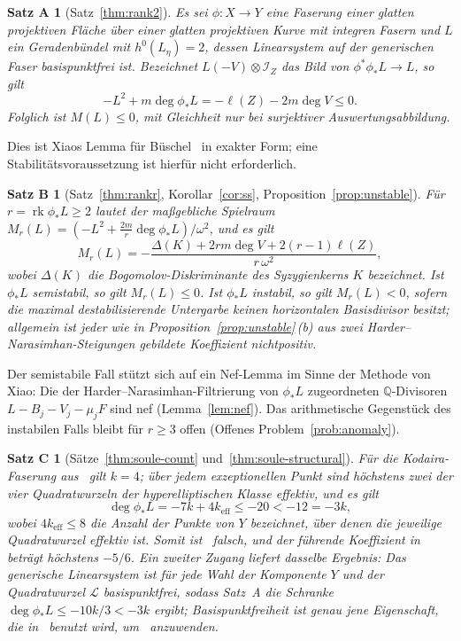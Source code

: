 \documentclass[11pt]{article}
\newtheorem*{theoremA}{Satz A}
\newtheorem*{theoremB}{Satz B}
\newtheorem*{theoremC}{Satz C}
\theoremstyle{definition}
\theoremstyle{remark}
\DeclareMathOperator{\rk}{rk}
\newcommand{\cI}{\mathcal{I}}
\newcommand{\cL}{\mathcal{L}}
\begin{document}
\begin{theoremA}[Satz~\ref{thm:rank2}]
Es sei $\phi\colon X\to Y$ eine Faserung einer glatten projektiven Fläche über
einer glatten projektiven Kurve mit integren Fasern und $L$ ein Geradenbündel mit
$h^0(L_\eta)=2$, dessen Linearsystem auf der generischen Faser basispunktfrei
ist. Bezeichnet $L(-V)\otimes\cI_Z$ das Bild von $\phi^*\phi_*L\to L$, so gilt
\[
-L^2+m\deg\phi_*L=-\ell(Z)-2m\deg V\le 0 .
\]
Folglich ist $M(L)\le 0$, mit Gleichheit nur bei surjektiver Auswertungsabbildung.
\end{theoremA}

Dies ist Xiaos Lemma für Büschel~\cite{Xi87} in exakter Form; eine
Stabilitätsvoraussetzung ist hierfür nicht erforderlich.

\begin{theoremB}[Satz~\ref{thm:rankr}, Korollar~\ref{cor:ss}, Proposition~\ref{prop:unstable}]
Für $r=\rk\phi_*L\ge 2$ lautet der maßgebliche Spielraum
$M_r(L)=(-L^2+\tfrac{2m}{r}\deg\phi_*L)/\omega^2$, und es gilt
\[
M_r(L)=-\frac{\Delta(K)+2rm\deg V+2(r-1)\ell(Z)}{r\,\omega^2},
\]
wobei $\Delta(K)$ die Bogomolov-Diskriminante des Syzygienkerns $K$ bezeichnet.
Ist $\phi_*L$ semistabil, so gilt $M_r(L)\le 0$. Ist $\phi_*L$ instabil, so gilt
$M_r(L)<0$, sofern die maximal destabilisierende Untergarbe keinen horizontalen
Basisdivisor besitzt; allgemein ist jeder wie in
Proposition~\ref{prop:unstable}\,(b) aus zwei Harder--Narasimhan-Steigungen
gebildete Koeffizient nichtpositiv.
\end{theoremB}

Der semistabile Fall stützt sich auf ein Nef-Lemma im Sinne der Methode von Xiao:
Die der Harder--Narasimhan-Filtrierung von $\phi_*L$ zugeordneten
$\mathbb{Q}$-Divisoren $L-B_j-V_j-\mu_jF$ sind nef (Lemma~\ref{lem:nef}). Das
arithmetische Gegenstück des instabilen Falls bleibt für $r\ge 3$ offen (Offenes
Problem~\ref{prob:anomaly}).

\begin{theoremC}[Sätze~\ref{thm:soule-count} und~\ref{thm:soule-structural}]
Für die Kodaira-Faserung aus~\cite{So26} gilt $k=4$; über jedem exzeptionellen
Punkt sind höchstens zwei der vier Quadratwurzeln der hyperelliptischen Klasse
effektiv, und es gilt
\[
\deg\phi_*L=-7k+4k_{\mathrm{eff}}\le -20<-12=-3k ,
\]
wobei $4k_{\mathrm{eff}}\le 8$ die Anzahl der Punkte von $Y$ bezeichnet, über
denen die jeweilige Quadratwurzel effektiv ist. Somit ist~\cite[Prop.~9\,vi)]{So26}
falsch, und der führende Koeffizient in~\cite[(36)]{So26} beträgt höchstens
$-5/6$. Ein zweiter Zugang liefert dasselbe Ergebnis: Das generische Linearsystem
ist für jede Wahl der Komponente $Y$ und der Quadratwurzel $\cL$ basispunktfrei,
sodass Satz~A die Schranke $\deg\phi_*L\le -10k/3<-3k$ ergibt;
Basispunktfreiheit ist genau jene Eigenschaft, die in~\cite[(28)]{So26} benutzt
wird, um~\cite[Prop.~3]{So26} anzuwenden.
\end{theoremC}
\end{document}
